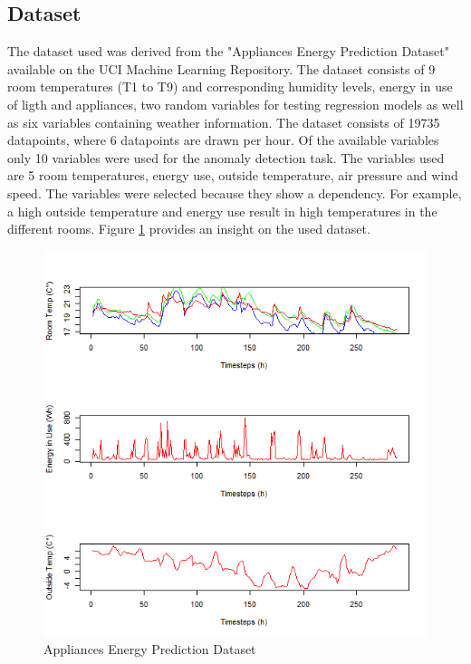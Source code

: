 \subsection{Dataset}
The dataset used was derived from the "Appliances Energy Prediction Dataset" available on the UCI Machine Learning Repository. The dataset consists of 9 room temperatures (T1 to T9) and corresponding humidity levels, energy in use of ligth and appliances, two random variables for testing regression models as well as six variables containing weather information. The dataset consists of 19735 datapoints, where 6 datapoints are drawn per hour. Of the available variables only 10 variables were used for the anomaly detection task. The variables used are 5 room temperatures, energy use, outside temperature, air pressure and wind speed. The variables were selected because they show a dependency. For example, a high outside temperature and energy use result in high temperatures in the different rooms. Figure \ref{fig:temp_dataset} provides an insight on the used dataset.


\begin{figure}[h]
	\centering
	\includegraphics[scale=0.6]{Figures/temp_dataset}
	\decoRule
	\caption[Temperature Dataset]{Appliances Energy Prediction Dataset \parencite{Own or UCI???}}
	\label{fig:temp_dataset}
\end{figure}

